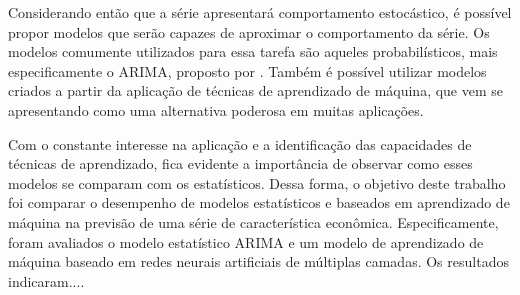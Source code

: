 \documentclass[
    12pt,
    oneside,
    a4paper,
    english,
    brazil
]{abntex2}
\begin{document}
Considerando  então  que  a  série  apresentará  comportamento  estocástico,  é
possível  propor  modelos  que  serão  capazes  de  aproximar  o  comportamento
da  série.  Os  modelos  comumente  utilizados para  essa  tarefa  são  aqueles
probabilísticos, mais especificamente o ARIMA\@, proposto por .
Também é possível utilizar modelos criados a partir da aplicação de técnicas de
aprendizado de máquina,  que vem se apresentando como  uma alternativa poderosa
em muitas aplicações.

Com o  constante interesse na  aplicação e  a identificação das  capacidades de
técnicas de  aprendizado, fica  evidente a importância  de observar  como esses
modelos se comparam com os estatísticos. Dessa forma, o objetivo deste trabalho
foi comparar o desempenho de modelos  estatísticos e baseados em aprendizado de
máquina na previsão de uma  série de característica econômica. Especificamente,
foram  avaliados  o  modelo  estatístico  ARIMA  e  um  modelo  de  aprendizado
de  máquina baseado  em  redes  neurais artificiais  de  múltiplas camadas.  Os
resultados indicaram....



\end{document}
